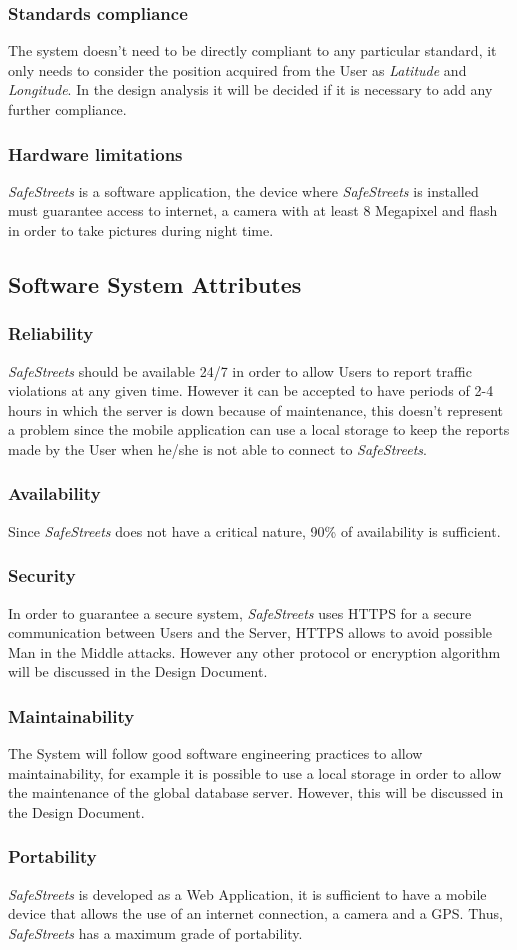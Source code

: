 \subsubsection{Standards compliance}
The system doesn't need to be directly compliant to any particular standard, it only needs to consider the position acquired from the User as \textit{Latitude} and \textit{Longitude}. In the design analysis it will be decided if it is necessary to add any further compliance.
\subsubsection{Hardware limitations}
\textit{SafeStreets} is a software application, the device where \textit{SafeStreets} is installed must guarantee access to internet, a camera with at least 8 Megapixel and flash in order to take pictures during night time. 

\subsection{Software System Attributes}

\subsubsection{Reliability}
\textit{SafeStreets} should be available 24/7 in order to allow Users to report traffic violations at any given time. However it can be accepted to have periods of 2-4 hours in which the server is down because of maintenance, this doesn't represent a problem since the mobile application can use a local storage to keep the reports made by the User when he/she is not able to connect to \textit{SafeStreets}.
\subsubsection{Availability}
Since \textit{SafeStreets} does not have a critical nature, 90\% of availability is sufficient.
\subsubsection{Security}
In order to guarantee a secure system, \textit{SafeStreets} uses HTTPS for a secure communication between Users and the Server, HTTPS allows to avoid possible Man in the Middle attacks. However any other protocol or encryption algorithm will be discussed in the Design Document.
\subsubsection{Maintainability}
The System will follow good software engineering practices to allow maintainability, for example it is possible to use a local storage in order to allow the maintenance of the global database server. However, this will be discussed in the Design Document.
\subsubsection{Portability}
\textit{SafeStreets} is developed as a Web Application, it is sufficient to have a mobile device that allows the use of an internet connection, a camera and a GPS. Thus, \textit{SafeStreets} has a maximum grade of portability.